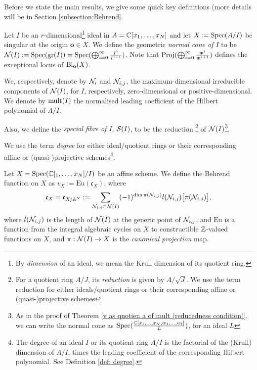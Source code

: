 \documentclass[11pt,a4paper,leqno,noamsfonts]{amsart}
\numberwithin{equation}{section}
\begin{document}
Before we state the main results, we give some quick key definitions (more details will be in Section \ref{subsection:Behrend}.

\begin{definition}\label{Def:normalCone}
Let $I$ be an $r$-dimensional\footnote{By \emph{dimension} of an ideal, we mean the Krull dimension of its quotient ring.} ideal in $A={\mathbb{C}}[x_1,\ldots,x_N]$ and let $X:=\operatorname{Spec}(A/I)$ be singular at the origin $\mathbf{o}\in X$. We define the geometric \textit{normal cone of $I$} to be ${\mathcal N}(I):=\operatorname{Spec}(\mathrm{gr}(I))=\operatorname{Spec}(\bigoplus_{i=0}^{\infty}\frac{I^i}{I^{i+1}})$. Note that $\operatorname{Proj}(\bigoplus_{i=0}^{\infty}\frac{\mathfrak{m}^i}{\mathfrak{m}^{i+1}})$ defines the exceptional locus of $\operatorname{Bl}_{\mathbf{o}}(X)$.

We, respectively, denote by ${\mathcal N}_i$ and ${\mathcal N}_{i,j}$, the maximum-dimensional irreducible components of  ${{\mathcal N}(I)}$, for $I$, respectively, zero-dimensional or positive-dimensional. We denote by $\mathrm{mult}(I)$ the normalised leading coefficient of the Hilbert polynomial of $A/I$. 








Also,  we define the \emph{special fibre of $I$}, ${\mathcal S}(I)$, to be  the reduction \footnote{For a quotient ring $A/J$, its \emph{reduction} is given by $A/\sqrt{J}$. We use the term reduction for either ideals/quotient rings or their corresponding affine or (quasi-)projective schemes} of ${\mathcal N}(I)$\footnote{As in the proof of Theorem \ref{v as quotien a of mult (reducedness condition)},  we can write the normal cone as $\operatorname{Spec}(\frac{{\mathbb{C}}[x_1,\ldots,x_N,w_1,\ldots,w_l]}{L})$, for an ideal $L$}.

We use the term \emph{degree} for either ideal/quotient rings or their corresponding affine or (quasi-)projective schemes\footnote{The degree of an ideal $I$ or its quotient ring $A/I$ is the factorial of the (Krull) dimension of $A/I$, times the leading coefficient of the corresponding Hilbert polynomial. See Definition \ref{def: degree}.}.
\end{definition}


\begin{definition} Let $X=\operatorname{Spec}({\mathbb{C}}[_1,\ldots,x_N]/I)$ be an affine scheme. We define the Behrend function on $X$ as  $v_X:=\mathrm{Eu}(\mathfrak{c}_X)$, where 
\begin{align*}
\mathfrak{c}_{X}=\mathfrak{c}_{X/{{\mathbb{A}}^N}}:=\sum_{{\mathcal N}_{i,j}\subset{\mathcal N}(I)}(-1)^{\dim\pi({\mathcal N}_{i,j})}l({\mathcal N}_{i,j})\big[\pi({\mathcal N}_{i,j})\big],
     \end{align*}
     where $l({\mathcal N}_{i,j})$ is the length of ${\mathcal N}(I)$ at the generic point of ${\mathcal N}_{i,j}$,
     and $\mathrm{Eu}$ is a function from the integral algebraic cycles on $X$ to constructible ${\mathbb{Z}}$-valued
functions on $X$, and $\pi: {\mathcal N}(I)\to X$ is the \emph{canonical projection} map.

\end{definition}
\end{document}
